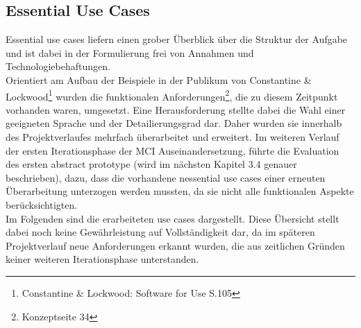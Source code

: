 \newpage
\subsection{Essential Use Cases}
Essential use cases liefern einen grober Überblick über die Struktur der Aufgabe und ist dabei in der Formulierung frei von Annahmen und Technologiebehaftungen.\\
Orientiert am Aufbau der Beispiele in der Publikum von Constantine \& Lockwood\footnote{Constantine \& Lockwood: Software for Use S.105} wurden die funktionalen Anforderungen\footnote{Konzeptseite 34}, die zu diesem Zeitpunkt vorhanden waren, umgesetzt.
Eine Herausforderung stellte dabei die Wahl einer geeigneten Sprache und der Detailierungsgrad dar. Daher wurden sie innerhalb des Projektverlaufes mehrfach überarbeitet und erweitert. Im weiteren Verlauf der ersten Iterationsphase der MCI Auseinandersetzung, führte die Evaluation des ersten abstract prototype (wird im nächsten Kapitel 3.4 genauer beschrieben), dazu, dass die vorhandene nessential use cases einer erneuten Überarbeitung unterzogen werden mussten, da sie nicht alle funktionalen Aspekte berücksichtigten.\\

Im Folgenden sind die erarbeiteten use cases dargestellt. Diese Übersicht stellt dabei noch keine Gewährleistung auf Vollständigkeit dar, da im späteren Projektverlauf neue Anforderungen erkannt wurden, die aus zeitlichen Gründen keiner weiteren Iterationsphase unterstanden.\\ 

